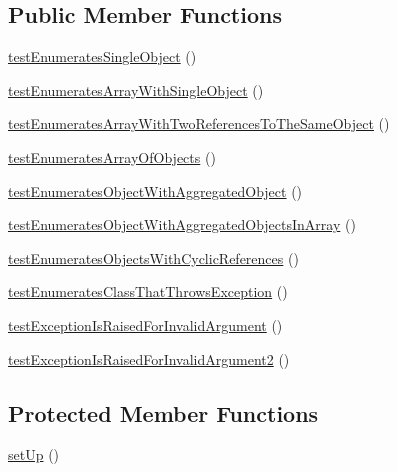 \subsection*{Public Member Functions}
\begin{DoxyCompactItemize}
\item 
\mbox{\hyperlink{class_sebastian_bergmann_1_1_object_enumerator_1_1_enumerator_test_a45e5b8ec418983ab6518cd5396a4e0ad}{test\+Enumerates\+Single\+Object}} ()
\item 
\mbox{\hyperlink{class_sebastian_bergmann_1_1_object_enumerator_1_1_enumerator_test_ace5c96290d57e36b6e4b30fc3ebe515b}{test\+Enumerates\+Array\+With\+Single\+Object}} ()
\item 
\mbox{\hyperlink{class_sebastian_bergmann_1_1_object_enumerator_1_1_enumerator_test_a3e172b78b523df4eba7da3b382dc617c}{test\+Enumerates\+Array\+With\+Two\+References\+To\+The\+Same\+Object}} ()
\item 
\mbox{\hyperlink{class_sebastian_bergmann_1_1_object_enumerator_1_1_enumerator_test_a5c29bcb102831b9c99c2c379788852c4}{test\+Enumerates\+Array\+Of\+Objects}} ()
\item 
\mbox{\hyperlink{class_sebastian_bergmann_1_1_object_enumerator_1_1_enumerator_test_ae5d550a9d2be89f476e8db285db1c218}{test\+Enumerates\+Object\+With\+Aggregated\+Object}} ()
\item 
\mbox{\hyperlink{class_sebastian_bergmann_1_1_object_enumerator_1_1_enumerator_test_ac664ae9fd6e5d95c75b751f3a93fd6db}{test\+Enumerates\+Object\+With\+Aggregated\+Objects\+In\+Array}} ()
\item 
\mbox{\hyperlink{class_sebastian_bergmann_1_1_object_enumerator_1_1_enumerator_test_a81e7ef22e2d5c7d69326861809315711}{test\+Enumerates\+Objects\+With\+Cyclic\+References}} ()
\item 
\mbox{\hyperlink{class_sebastian_bergmann_1_1_object_enumerator_1_1_enumerator_test_ac0a47b49467456d9dcaa414966aa1ffe}{test\+Enumerates\+Class\+That\+Throws\+Exception}} ()
\item 
\mbox{\hyperlink{class_sebastian_bergmann_1_1_object_enumerator_1_1_enumerator_test_ad8dbfe9c0ff9dc1ce03e7f3329c703ca}{test\+Exception\+Is\+Raised\+For\+Invalid\+Argument}} ()
\item 
\mbox{\hyperlink{class_sebastian_bergmann_1_1_object_enumerator_1_1_enumerator_test_a889747efb24c2ff3d8c89042cb0f913a}{test\+Exception\+Is\+Raised\+For\+Invalid\+Argument2}} ()
\end{DoxyCompactItemize}
\subsection*{Protected Member Functions}
\begin{DoxyCompactItemize}
\item 
\mbox{\hyperlink{class_sebastian_bergmann_1_1_object_enumerator_1_1_enumerator_test_a0bc688732d2b3b162ffebaf7812e78da}{set\+Up}} ()
\end{DoxyCompactItemize}
